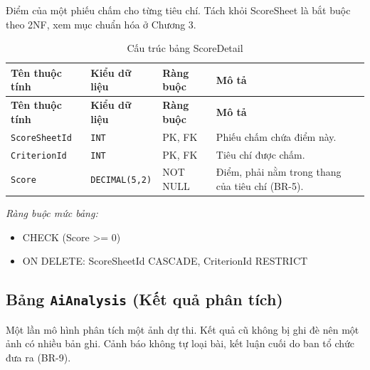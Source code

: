 Điểm của một phiếu chấm cho từng tiêu chí. Tách khỏi ScoreSheet là bắt buộc theo 2NF, xem mục chuẩn hóa ở Chương 3.

\begin{longtable}{|L{4cm}|L{3.15cm}|L{2.4cm}|L{4.55cm}|}
\caption{Cấu trúc bảng ScoreDetail} \\
\hline
\textbf{Tên thuộc tính} & \textbf{Kiểu dữ liệu} & \textbf{Ràng buộc} & \textbf{Mô tả} \\ \hline
\endfirsthead
\hline
\textbf{Tên thuộc tính} & \textbf{Kiểu dữ liệu} & \textbf{Ràng buộc} & \textbf{Mô tả} \\ \hline
\endhead
\texttt{ScoreSheetId} & \texttt{INT} & PK, FK & Phiếu chấm chứa điểm này. \\ \hline
\texttt{CriterionId} & \texttt{INT} & PK, FK & Tiêu chí được chấm. \\ \hline
\texttt{Score} & \texttt{DECIMAL(5,2)} & NOT NULL & Điểm, phải nằm trong thang của tiêu chí (BR-5). \\ \hline
\end{longtable}

\noindent\textit{Ràng buộc mức bảng:}

\begin{itemize}\raggedright
    \item CHECK (Score >= 0)
    \item ON DELETE: ScoreSheetId CASCADE,\allowbreak{} CriterionId RESTRICT
\end{itemize}

\subsection{Bảng \texttt{AiAnalysis} (Kết quả phân tích)}

Một lần mô hình phân tích một ảnh dự thi. Kết quả cũ không bị ghi đè nên một ảnh có nhiều bản ghi. Cảnh báo không tự loại bài, kết luận cuối do ban tổ chức đưa ra (BR-9).

